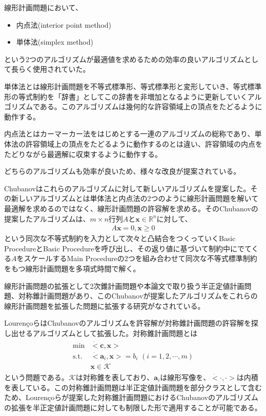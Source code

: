線形計画問題において、
\begin{itemize}
  \item 内点法(interior point method)
  \item 単体法(simplex method)
\end{itemize}
という2つのアルゴリズムが最適値を求めるための効率の良いアルゴリズムとして長らく使用されていた。

単体法とは線形計画問題を不等式標準形、等式標準形と変形していき、等式標準形の等式制約を「辞書」としてこの辞書を非増加となるように更新していくアルゴリズムである。このアルゴリズムは幾何的な許容領域上の頂点をたどるように動作する。

内点法とはカーマーカー法をはじめとする一連のアルゴリズムの総称であり、単体法の許容領域上の頂点をたどるように動作するのとは違い、許容領域の内点をたどりながら最適解に収束するように動作する。

どちらのアルゴリズムも効率が良いため、様々な改良が提案されている\cite{Optimization}\cite{InteriorPointMethod}。

Chubanovはこれらのアルゴリズムに対して新しいアルゴリズムを提案した\cite{Chubanov}。その新しいアルゴリズムとは単体法と内点法の2つのように線形計画問題を解いて最適解を求めるのではなく、線形計画問題の許容解を求める。そのChubanovの提案したアルゴリズムは、$m \times n$行列$A$と$\mathbf{x} \in \mathbb{R}^n$に対して、
\begin{align*}
  A \mathbf{x} = 0, \mathbf{x} \geq 0
\end{align*}
という同次な不等式制約を入力として次々と凸結合をつくっていくBasic ProcedureとBasic Procedureを呼び出し、その返り値に基づいて制約中にでてくる$A$をスケールするMain Procedureの2つを組み合わせて同次な不等式標準制約をもつ線形計画問題を多項式時間で解く。

線形計画問題の拡張として2次錐計画問題や本論文で取り扱う半正定値計画問題、対称錐計画問題があり、このChubanovが提案したアルゴリズムをこれらの線形計画問題を拡張した問題に拡張する研究がなされている\cite{SOCP}\cite{SymmetricCone}。

Louren\c{c}oらはChubanovのアルゴリズムを許容解が対称錐計画問題の許容解を探し出せるアルゴリズムとして拡張した\cite{SymmetricCone}。対称錐計画問題とは
\begin{align*}
  \begin{array}{ll}
    \text{min}  & \dot<\mathbf{c}, \mathbf{x}> \\
    \text{s.t.} & \dot<\mathbf{a}_i, \mathbf{x}> = b_i \,\, (i = 1, 2, \cdots, m) \\
                & \mathbf{x} \in \mathcal{K}
  \end{array}
\end{align*}
という問題である。$\mathcal{K}$は対称錐を表しており、$\mathbf{a}_i$は線形写像を、$\dot<\cdot, \cdot>$は内積を表している。この対称錐計画問題は半正定値計画問題を部分クラスとして含むため、Louren\c{c}oらが提案した対称錐計画問題におけるChubanovのアルゴリズムの拡張を半正定値計画問題に対しても制限した形で適用することが可能である。

